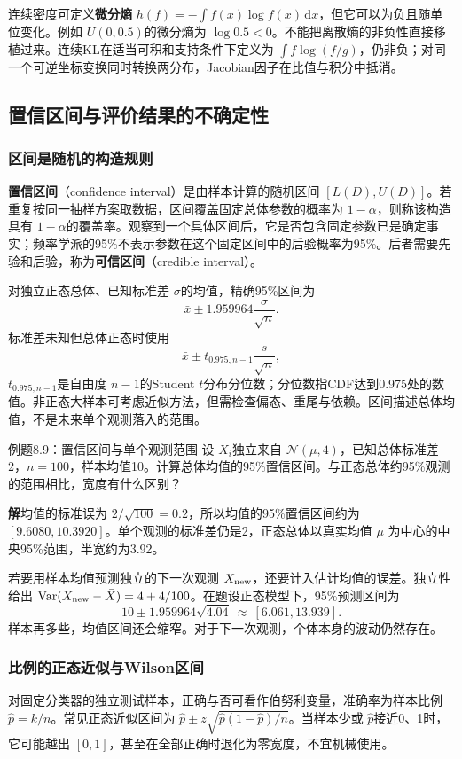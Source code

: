 \documentclass[UTF8,fontset=none,zihao=-4,a4paper]{ctexart}
\newcommand{\term}[1]{\textbf{#1}}
\newcommand{\sol}{\par\noindent\textbf{解}\quad}
\numberwithin{equation}{section}
\numberwithin{figure}{section}
\begin{document}
连续密度可定义\term{微分熵} $h(f)=-\int f(x)\log f(x)\,\mathrm dx$，但它可以为负且随单位变化。例如 $U(0,0.5)$的微分熵为 $\log0.5<0$。不能把离散熵的非负性直接移植过来。连续KL在适当可积和支持条件下定义为 $\int f\log(f/g)$，仍非负；对同一个可逆坐标变换同时转换两分布，Jacobian因子在比值与积分中抵消。

\subsection{置信区间与评价结果的不确定性}
\subsubsection{区间是随机的构造规则}
\term{置信区间}（confidence interval）是由样本计算的随机区间 $[L(D),U(D)]$。若重复按同一抽样方案取数据，区间覆盖固定总体参数的概率为 $1-\alpha$，则称该构造具有 $1-\alpha$的覆盖率。观察到一个具体区间后，它是否包含固定参数已是确定事实；频率学派的95\%不表示参数在这个固定区间中的后验概率为95\%。后者需要先验和后验，称为\term{可信区间}（credible interval）。

对独立正态总体、已知标准差 $\sigma$的均值，精确95\%区间为
\[
 \bar x\pm1.959964\frac\sigma{\sqrt n}.
\]
标准差未知但总体正态时使用
\[
 \bar x\pm t_{0.975,n-1}\frac{s}{\sqrt n},
\]
$t_{0.975,n-1}$是自由度 $n-1$的Student $t$分布分位数；分位数指CDF达到0.975处的数值。非正态大样本可考虑近似方法，但需检查偏态、重尾与依赖。区间描述总体均值，不是未来单个观测落入的范围。

\begin{infobox}{例题8.9：置信区间与单个观测范围}
设 $X_i$独立来自 $\mathcal N(\mu,4)$，已知总体标准差2，$n=100$，样本均值10。计算总体均值的95\%置信区间。与正态总体约95\%观测的范围相比，宽度有什么区别？
\end{infobox}
\sol 均值的标准误为 $2/\sqrt{100}=0.2$，所以均值的95\%置信区间约为 $[9.6080,10.3920]$。单个观测的标准差仍是2，正态总体以真实均值 $\mu$ 为中心的中央95\%范围，半宽约为3.92。

若要用样本均值预测独立的下一次观测 $X_{\rm new}$，还要计入估计均值的误差。独立性给出 $\operatorname{Var}(X_{\rm new}-\bar X)=4+4/100$。在题设正态模型下，95\%预测区间为
\[
 10\pm1.959964\sqrt{4.04}\ \approx\ [6.061,13.939].
\]
样本再多些，均值区间还会缩窄。对于下一次观测，个体本身的波动仍然存在。

\subsubsection{比例的正态近似与Wilson区间}
对固定分类器的独立测试样本，正确与否可看作伯努利变量，准确率为样本比例 $\hat p=k/n$。常见正态近似区间为 $\hat p\pm z\sqrt{\hat p(1-\hat p)/n}$。当样本少或 $\hat p$接近0、1时，它可能越出 $[0,1]$，甚至在全部正确时退化为零宽度，不宜机械使用。
\end{document}
